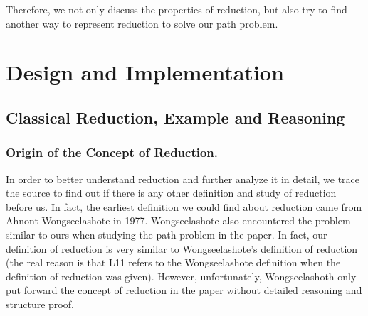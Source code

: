 \documentclass[a4paper,12pt,twoside,openright]{report}
\begin{document}
Therefore, we not only discuss the properties of reduction, but also try to find another way to represent reduction to solve our path problem.



%
%
%

\chapter{Design and Implementation} 


\section{Classical Reduction, Example and Reasoning}
\subsection{Origin of the Concept of Reduction.}
In order to better understand reduction and further analyze it in detail, we trace the source to find out if there is any other definition and study of reduction before us. 
In fact, the earliest definition we could find about reduction came from Ahnont Wongseelashote in 1977\cite{WONGSEELASHOTE197955}. Wongseelashote also encountered the problem similar to ours when studying the path problem in the paper. In fact, our definition of reduction is very similar to Wongseelashote's definition of reduction (the real reason is that L11 refers to the Wongseelashote definition when the definition of reduction was given). However, unfortunately, Wongseelashoth only put forward the concept of reduction in the paper without detailed reasoning and structure proof.
\end{document}
